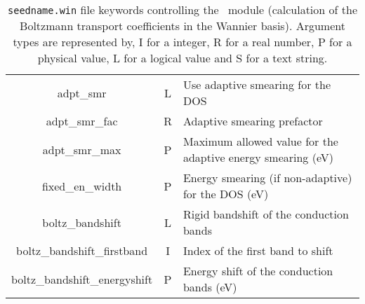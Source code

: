 \begin{table}[h!]
\begin{center}
\begin{tabular}{|c|c|p{6cm}|}
{adpt\_smr} & L & Use adaptive smearing for the DOS \\
{adpt\_smr\_fac} & R & Adaptive smearing prefactor\\
{adpt\_smr\_max} & P & Maximum allowed value for the
adaptive energy smearing (eV)\\
{fixed\_en\_width} & P  & Energy smearing (if non-adaptive) for the DOS (eV) \\
{\sc boltz\_bandshift} & L & Rigid bandshift of the conduction bands\\
{\sc boltz\_bandshift\_firstband} & I & Index of the first band to shift\\
{\sc boltz\_bandshift\_energyshift} & P & Energy shift of the conduction bands (eV)\\
\hline
\end{tabular}
\caption[Parameter file keywords controlling the \bw\ module.]
{{\tt seedname.win} file keywords controlling the \bw\ module (calculation of the Boltzmann transport coefficients in the Wannier basis). Argument types
are represented by, I for a integer, R for a real number, P for a
physical value, L for a logical value and S for a text string.}
\label{parameter_keywords_bw}
\end{center}
\end{table}

